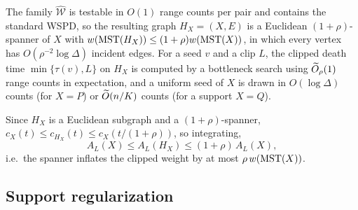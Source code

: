 \begin{lemma}\label{lem:realize}
The family $\widehat{\mathcal W}$ is testable in $O(1)$ range counts per pair and contains the standard
WSPD, so the resulting graph $H_X=(X,E)$ is a Euclidean $(1+\rho)$-spanner of $X$ with
$w(\mathrm{MST}(H_X))\le(1+\rho)w(\mathrm{MST}(X))$, in which every vertex has $O(\rho^{-2}\log\Delta)$ incident edges.
For a seed $v$ and a clip $L$, the clipped death time $\min\{\tau(v),L\}$ on $H_X$ is computed by a
bottleneck search using $\widetilde{O}_\rho(1)$ range counts in expectation, and a uniform seed of $X$ is drawn in
$O(\log\Delta)$ counts (for $X=P$) or $\widetilde{O}(n/K)$ counts (for a support $X=Q$).
\end{lemma}

Since $H_X$ is a Euclidean subgraph and a $(1+\rho)$-spanner, $c_X(t)\le c_{H_X}(t)\le c_X(t/(1+\rho))$, so
integrating,
\begin{equation}\label{eq:spanner-stretch}
  A_L(X)\le A_L(H_X)\le(1+\rho)\,A_L(X),
\end{equation}
i.e.\ the spanner inflates the clipped weight by at most $\rho\,w(\mathrm{MST}(X))$.

\subsection{Support regularization}\label{sec:dt-regularize}

